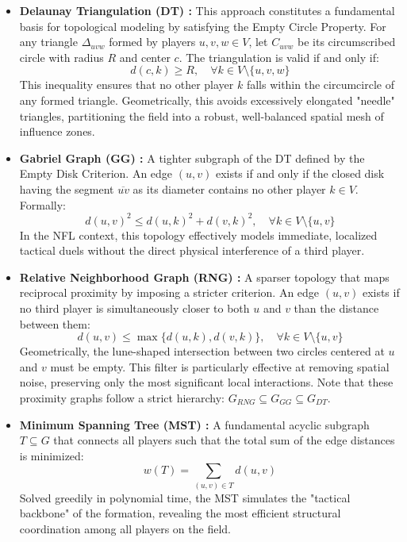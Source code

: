 \documentclass[runningheads]{llncs}
\begin{document}
\begin{itemize}
    \item \textbf{Delaunay Triangulation (DT) \cite{delaunay1934sphere,elshakhs2024comprehensive}:} This approach constitutes a fundamental basis for topological modeling by satisfying the Empty Circle Property. For any triangle $\Delta_{uvw}$ formed by players $u, v, w \in V$, let $C_{uvw}$ be its circumscribed circle with radius $R$ and center $c$. The triangulation is valid if and only if:
\begin{equation}
    d(c, k) \ge R, \quad \forall k \in V \setminus \{u, v, w\}
\end{equation}
This inequality ensures that no other player $k$ falls within the circumcircle of any formed triangle. Geometrically, this avoids excessively elongated "needle" triangles, partitioning the field into a robust, well-balanced spatial mesh of influence zones.

    \item \textbf{Gabriel Graph (GG) \cite{gabriel1969new}:} A tighter subgraph of the DT defined by the Empty Disk Criterion. An edge $(u, v)$ exists if and only if the closed disk having the segment $\overline{uv}$ as its diameter contains no other player $k \in V$. Formally:
\begin{equation}
    d(u, v)^2 \le d(u, k)^2 + d(v, k)^2, \quad \forall k \in V \setminus \{u, v\}
\end{equation}
In the NFL context, this topology effectively models immediate, localized tactical duels without the direct physical interference of a third player.

    \item \textbf{Relative Neighborhood Graph (RNG) \cite{toussaint1980relative}:} A sparser topology that maps reciprocal proximity by imposing a stricter criterion. An edge $(u, v)$ exists if no third player is simultaneously closer to both $u$ and $v$ than the distance between them:
\begin{equation}
    d(u, v) \le \max \{d(u, k), d(v, k)\}, \quad \forall k \in V \setminus \{u, v\}
\end{equation}
Geometrically, the lune-shaped intersection between two circles centered at $u$ and $v$ must be empty. This filter is particularly effective at removing spatial noise, preserving only the most significant local interactions. Note that these proximity graphs follow a strict hierarchy: $G_{RNG} \subseteq G_{GG} \subseteq G_{DT}$.

    \item \textbf{Minimum Spanning Tree (MST) \cite{Prim1957,Kruskal1956}:} A fundamental acyclic subgraph $T \subseteq G$ that connects all players such that the total sum of the edge distances is minimized:
\begin{equation}
    w(T) = \sum_{(u,v) \in T} d(u,v)
\end{equation}
Solved greedily in polynomial time, the MST simulates the "tactical backbone" of the formation, revealing the most efficient structural coordination among all players on the field.


\end{itemize}
\end{document}
